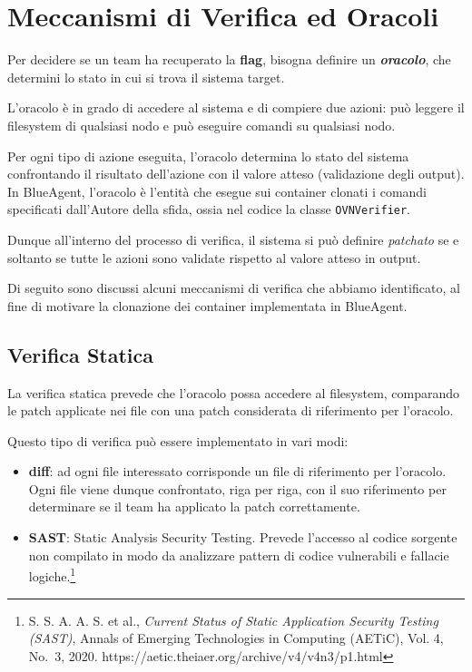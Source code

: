 \section{Meccanismi di Verifica ed
Oracoli}\label{meccanismi-di-verifica-ed-oracoli}

Per decidere se un team ha recuperato la \textbf{flag}, bisogna definire
un \textbf{\emph{oracolo}}, che determini lo stato in cui si trova il
sistema target.

L'oracolo è in grado di accedere al sistema e di compiere due azioni:
può leggere il filesystem di qualsiasi nodo e può eseguire comandi su
qualsiasi nodo.

Per ogni tipo di azione eseguita, l'oracolo determina lo stato del
sistema confrontando il risultato dell'azione con il valore atteso
(validazione degli output). In BlueAgent, l'oracolo è l'entità che
esegue sui container clonati i comandi specificati dall'Autore della
sfida, ossia nel codice la classe \passthrough{\lstinline!OVNVerifier!}.

Dunque all'interno del processo di verifica, il sistema si può definire
\emph{patchato} se e soltanto se tutte le azioni sono validate rispetto
al valore atteso in output.

Di seguito sono discussi alcuni meccanismi di verifica che abbiamo
identificato, al fine di motivare la clonazione dei container
implementata in BlueAgent.

\subsection{Verifica Statica}\label{verifica-statica}

La verifica statica prevede che l'oracolo possa accedere al filesystem,
comparando le patch applicate nei file con una patch considerata di
riferimento per l'oracolo.

Questo tipo di verifica può essere implementato in vari modi:

\begin{itemize}
\tightlist
\item
  \textbf{diff}: ad ogni file interessato corrisponde un file di
  riferimento per l'oracolo. Ogni file viene dunque confrontato, riga
  per riga, con il suo riferimento per determinare se il team ha
  applicato la patch correttamente.
\item
  \textbf{SAST}: Static Analysis Security Testing. Prevede l'accesso al
  codice sorgente non compilato in modo da analizzare pattern di codice
  vulnerabili e fallacie logiche.\footnote{\label{fn:ref_14}S. S. A. A. S. et al.,
    \emph{Current Status of Static Application Security Testing (SAST)},
    Annals of Emerging Technologies in Computing (AETiC), Vol. 4, No.~3,
    2020. https://aetic.theiaer.org/archive/v4/v4n3/p1.html}
\end{itemize}

